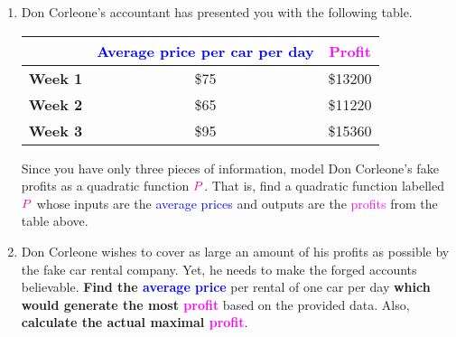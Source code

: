 \documentclass[a4paper,11pt]{article}
\newcommand{\clb}{\textcolor{blue}}
\newcommand{\clm}{\textcolor{magenta}}
\begin{document}
\begin{enumerate}
 \item Don Corleone's accountant has presented you with the following table.
  \begin{table}[h]
   \renewcommand{\arraystretch}{1.3}
   \centering
   \begin{tabular}{c|cc}
    & \textbf{\clb{Average price per car per day}} & \textbf{\clm{Profit}} \\
    \toprule
    \textbf{Week 1} & \$75 & \$13200\\
    \textbf{Week 2} & \$65 & \$11220\\
    \textbf{Week 3} & \$95 & \$15360
   \end{tabular}
  \end{table}
 
  Since you have only three pieces of information, model Don Corleone's fake
  profits as a quadratic function $\clm{P}$. That is, find a quadratic function
  labelled $\clm{P}$ whose inputs are the \clb{average prices} and outputs are
  the \clm{profits} from the table above.
 \item Don Corleone wishes to cover as large an amount of his profits as
  possible by the fake car rental company. Yet, he needs to make the forged
  accounts believable. \textbf{Find the \clb{average price}} per rental of one
  car per day \textbf{which would generate the most \clm{profit}} based on the
  provided data. Also, \textbf{calculate the actual maximal \clm{profit}}.
\end{enumerate}
\clearpage
\null
\clearpage
\end{document}

